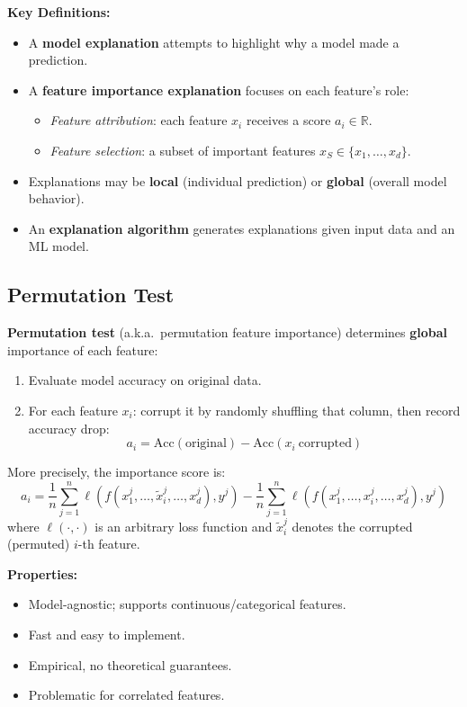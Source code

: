 \documentclass[UTF8]{ctexart}
\begin{document}
\textbf{Key Definitions:}
\begin{itemize}
    \item A \textbf{model explanation} attempts to highlight why a model made a prediction.
    \item A \textbf{feature importance explanation} focuses on each feature's role:
    \begin{itemize}
        \item \textit{Feature attribution}: each feature $x_i$ receives a score $a_i \in \mathbb{R}$.
        \item \textit{Feature selection}: a subset of important features $x_S \in \{x_1, \ldots, x_d\}$.
    \end{itemize}
    \item Explanations may be \textbf{local} (individual prediction) or \textbf{global} (overall model behavior).
    \item An \textbf{explanation algorithm} generates explanations given input data and an ML model.
\end{itemize}

\subsection{Permutation Test}

\textbf{Permutation test} (a.k.a.\ permutation feature importance) determines \textbf{global} importance of each feature:
\begin{enumerate}
    \item Evaluate model accuracy on original data.
    \item For each feature $x_i$: corrupt it by randomly shuffling that column, then record accuracy drop:
    \[
        a_i = \mathrm{Acc}(\text{original}) - \mathrm{Acc}(x_i\ \text{corrupted})
    \]
\end{enumerate}

More precisely, the importance score is:
\[
    a_i = \frac{1}{n}\sum_{j=1}^{n} \ell\!\left(f\!\left(x_1^j,\ldots,\tilde{x}_i^j,\ldots,x_d^j\right), y^j\right)
    - \frac{1}{n}\sum_{j=1}^{n} \ell\!\left(f\!\left(x_1^j,\ldots,x_i^j,\ldots,x_d^j\right), y^j\right)
\]
where $\ell(\cdot,\cdot)$ is an arbitrary loss function and $\tilde{x}_i^j$ denotes the corrupted (permuted) $i$-th feature.

\textbf{Properties:}
\begin{itemize}
    \item Model-agnostic; supports continuous/categorical features.
    \item Fast and easy to implement.
    \item Empirical, no theoretical guarantees.
    \item Problematic for correlated features.
\end{itemize}
\end{document}
